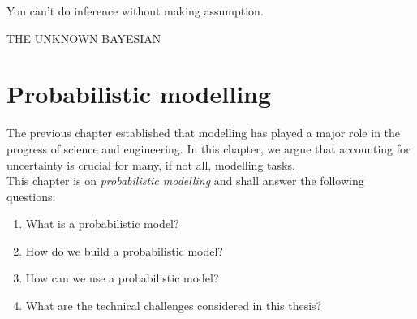 {\centering
\parbox{\textwidth}{%
  \raggedright{\normal\itshape%

  You can't do inference without making assumption.\par\bigskip
  }
  \raggedleft\normal\MakeUppercase{The unknown Bayesian}\par%
}}

\chapter{Probabilistic modelling}\label{ch:02}

\begin{chapter_outline}
  The previous chapter established that modelling has played a major role in the progress of science and engineering.
  In this chapter, we argue that accounting for uncertainty is crucial for many, if not all, modelling tasks.
  \\
  This chapter is on \textit{probabilistic modelling} and shall answer the following questions:
  \begin{enumerate}
    \item What is a probabilistic model?
    \item How do we build a probabilistic model?
    \item How can we use a probabilistic model?
    \item What are the technical challenges considered in this thesis?
  \end{enumerate}

\end{chapter_outline}


